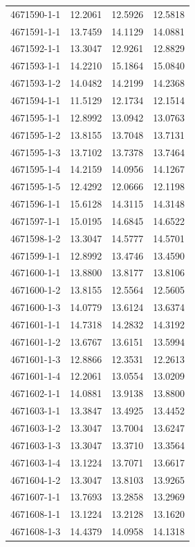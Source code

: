 \begin{longtable}{lrrr}
4671590-1-1 & 12.2061 & 12.5926 & 12.5818 \\
4671591-1-1 & 13.7459 & 14.1129 & 14.0881 \\
4671592-1-1 & 13.3047 & 12.9261 & 12.8829 \\
4671593-1-1 & 14.2210 & 15.1864 & 15.0840 \\
4671593-1-2 & 14.0482 & 14.2199 & 14.2368 \\
4671594-1-1 & 11.5129 & 12.1734 & 12.1514 \\
4671595-1-1 & 12.8992 & 13.0942 & 13.0763 \\
4671595-1-2 & 13.8155 & 13.7048 & 13.7131 \\
4671595-1-3 & 13.7102 & 13.7378 & 13.7464 \\
4671595-1-4 & 14.2159 & 14.0956 & 14.1267 \\
4671595-1-5 & 12.4292 & 12.0666 & 12.1198 \\
4671596-1-1 & 15.6128 & 14.3115 & 14.3148 \\
4671597-1-1 & 15.0195 & 14.6845 & 14.6522 \\
4671598-1-2 & 13.3047 & 14.5777 & 14.5701 \\
4671599-1-1 & 12.8992 & 13.4746 & 13.4590 \\
4671600-1-1 & 13.8800 & 13.8177 & 13.8106 \\
4671600-1-2 & 13.8155 & 12.5564 & 12.5605 \\
4671600-1-3 & 14.0779 & 13.6124 & 13.6374 \\
4671601-1-1 & 14.7318 & 14.2832 & 14.3192 \\
4671601-1-2 & 13.6767 & 13.6151 & 13.5994 \\
4671601-1-3 & 12.8866 & 12.3531 & 12.2613 \\
4671601-1-4 & 12.2061 & 13.0554 & 13.0209 \\
4671602-1-1 & 14.0881 & 13.9138 & 13.8800 \\
4671603-1-1 & 13.3847 & 13.4925 & 13.4452 \\
4671603-1-2 & 13.3047 & 13.7004 & 13.6247 \\
4671603-1-3 & 13.3047 & 13.3710 & 13.3564 \\
4671603-1-4 & 13.1224 & 13.7071 & 13.6617 \\
4671604-1-2 & 13.3047 & 13.8103 & 13.9265 \\
4671607-1-1 & 13.7693 & 13.2858 & 13.2969 \\
4671608-1-1 & 13.1224 & 13.2128 & 13.1620 \\
4671608-1-3 & 14.4379 & 14.0958 & 14.1318 \\

\end{longtable}
